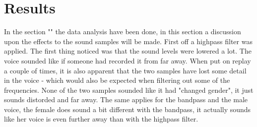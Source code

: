 
\section{Results}
In the section "" the data analysis have been done, in this section a discussion upon the effects to the sound samples will be made. First off a highpass filter was applied. The first thing noticed was that the sound levels were lowered a lot. The voice sounded like if someone had recorded it from far away. When put on replay a couple of times, it is also apparent that the two samples have lost some detail in the voice - which would also be expected when filtering out some of the frequencies. None of the two samples sounded like it had "changed gender", it just sounds distorded and far away. The same applies for the bandpass and the male voice, the female does sound a bit different with the bandpass, it actually sounds like her voice is even further away than with the highpass filter. 